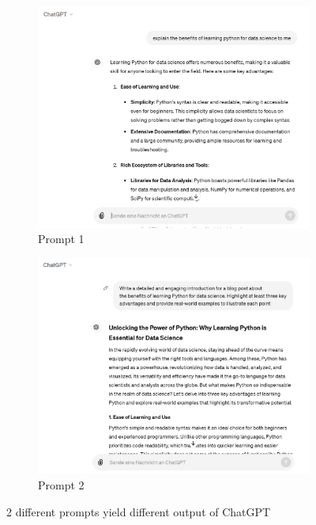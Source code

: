 \documentclass[runningheads]{llncs}
\begin{document}
\begin{figure}[H]
  \centering
  \begin{subfigure}[b]{0.48\textwidth}
      \centering
      \includegraphics[width=\textwidth]{prompt_ds_1.PNG}
      \caption{Prompt 1}
      \label{fig:prompt1}
  \end{subfigure}
  \hfill
  \begin{subfigure}[b]{0.48\textwidth}
      \centering
      \includegraphics[width=\textwidth]{prompt_ds_2.PNG}
      \caption{Prompt 2}
      \label{fig:prompt2}
  \end{subfigure}
  \caption{2 different prompts yield different output of ChatGPT}
  \label{fig:both_prompts}
\end{figure}
\end{document}
